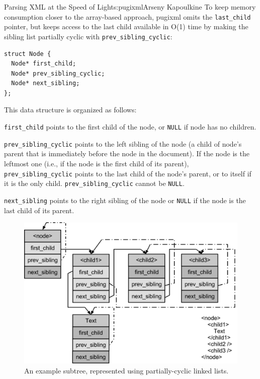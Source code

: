 \begin{aosachapter}{Parsing XML at the Speed of Light}{s:pugixml}{Arseny Kapoulkine}
To keep memory consumption closer to the array-based approach, pugixml
omits the \texttt{last\_child} pointer, but keeps access to the last
child available in O(1) time by making the sibling list partially cyclic
with \texttt{prev\_sibling\_cyclic}:

\begin{verbatim}
struct Node {
  Node* first_child;
  Node* prev_sibling_cyclic;
  Node* next_sibling;
};
\end{verbatim}

\noindent This data structure is organized as follows:

\begin{aosaenumerate}
\def\labelenumi{\arabic{enumi}.}

\item
  \texttt{first\_child} points to the first child of the node, or
  \texttt{NULL} if node has no children.
\item
  \texttt{prev\_sibling\_cyclic} points to the left sibling of the node
  (a child of node's parent that is immediately before the node in the
  document). If the node is the leftmost one (i.e., if the node is the
  first child of its parent), \texttt{prev\_sibling\_cyclic} points to
  the last child of the node's parent, or to itself if it is the only
  child. \texttt{prev\_sibling\_cyclic} cannot be \texttt{NULL}.
\item
  \texttt{next\_sibling} points to the right sibling of the node or
  \texttt{NULL} if the node is the last child of its parent.
\end{aosaenumerate}

\begin{figure}[htbp]
\centering
\includegraphics{pugixml-images/image00.png}
\caption{An example subtree, represented using partially-cyclic linked
lists.}
\end{figure}


\end{aosachapter}
